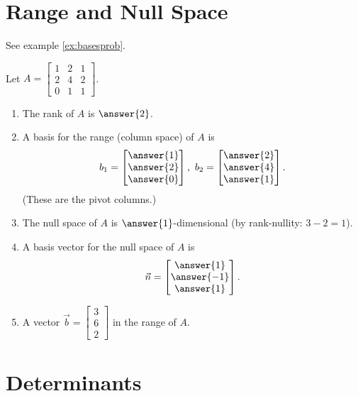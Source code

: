 \documentclass{ximera}
\begin{document}
\section*{Range and Null Space}

See example \ref{ex:basesprob}.

\begin{example}
    Let $A = \begin{bmatrix} 1 & 2 & 1 \\ 2 & 4 & 2 \\ 0 & 1 & 1 \end{bmatrix}$.
    \begin{enumerate}
        \item The rank of $A$ is $\answer{2}$.

        \item A basis for the range (column space) of $A$ is
        \[
        b_1 = \begin{bmatrix} \answer{1} \\ \answer{2} \\ \answer{0} \end{bmatrix}, \quad b_2 = \begin{bmatrix} \answer{2} \\ \answer{4} \\ \answer{1} \end{bmatrix}.
        \]
        (These are the pivot columns.)

        \item The null space of $A$ is $\answer{1}$-dimensional (by rank-nullity: $3 - 2 = 1$).

        \item A basis vector for the null space of $A$ is
        \[
        \vec{n} = \begin{bmatrix} \answer{1} \\ \answer{-1} \\ \answer{1} \end{bmatrix}.
        \]

        \item A vector $\vec{b} = \begin{bmatrix} 3 \\ 6 \\ 2 \end{bmatrix}$  in the range of $A$.
    \end{enumerate}
\end{example}

\section*{Determinants}
\end{document}
